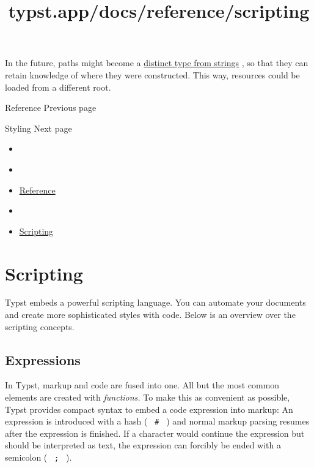In the future, paths might become a
\href{https://github.com/typst/typst/issues/971}{distinct type from
strings} , so that they can retain knowledge of where they were
constructed. This way, resources could be loaded from a different root.

\href{/docs/reference/}{\pandocbounded{}}

{ Reference } { Previous page }

\href{/docs/reference/styling/}{\pandocbounded{}}

{ Styling } { Next page }


\title{typst.app/docs/reference/scripting}

\begin{itemize}
\tightlist
\item
  \href{/docs}{}
\item
  
\item
  \href{/docs/reference/}{Reference}
\item
  
\item
  \href{/docs/reference/scripting/}{Scripting}
\end{itemize}

\section{Scripting}\label{scripting}

Typst embeds a powerful scripting language. You can automate your
documents and create more sophisticated styles with code. Below is an
overview over the scripting concepts.

\subsection{Expressions}\label{expressions}

In Typst, markup and code are fused into one. All but the most common
elements are created with \emph{functions.} To make this as convenient
as possible, Typst provides compact syntax to embed a code expression
into markup: An expression is introduced with a hash ( \texttt{\ \#\ } )
and normal markup parsing resumes after the expression is finished. If a
character would continue the expression but should be interpreted as
text, the expression can forcibly be ended with a semicolon (
\texttt{\ ;\ } ).

